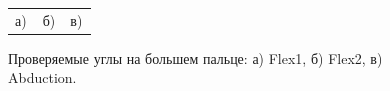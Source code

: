 \begin{figure}[H]
\begin{minipage}[h]{0.32\linewidth}
\end{minipage}
\hfill
\begin{minipage}[h]{0.32\linewidth}
\end{minipage}
\begin{minipage}[h]{1\linewidth}
\begin{tabular}{p{0.32\linewidth}p{0.32\linewidth}p{0.32\linewidth}}
\centering а) & \centering б) & \centering в) \\
\end{tabular}
\end{minipage}
\vspace*{-1cm}
\caption{Проверяемые углы на большем пальце: а) Flex1, б) Flex2, в) Abduction.}
\label{fig:finger_motion_type_1}
\end{figure}

